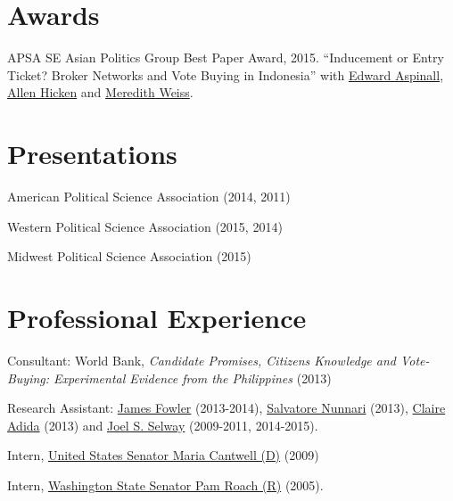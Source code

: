 \documentclass[letterpaper]{article}
\renewenvironment{itemize}{
  \begin{list}{}{
    \setlength{\leftmargin}{1.5em}
  }
}{
  \end{list}
}
\begin{document}
\section*{Awards}
\begin{itemize}
  \item APSA SE Asian Politics Group Best Paper Award, 2015. ``Inducement or Entry Ticket? Broker Networks and Vote Buying in Indonesia'' with \href{https://researchers.anu.edu.au/researchers/aspinall-et}{Edward Aspinall}, \href{http://www.allenhicken.com/}{Allen Hicken} and \href{http://www.albany.edu/rockefeller/faculty_pos_weiss.shtml}{Meredith Weiss}.
\end{itemize}


\section*{Presentations}
\begin{itemize}
  \item American Political Science Association (2014, 2011)
  \item Western Political Science Association (2015, 2014)
  \item Midwest Political Science Association (2015)
\end{itemize}

\section*{Professional Experience}

\begin{itemize}
\item Consultant: World Bank, \emph{Candidate Promises, Citizens Knowledge and Vote-Buying: Experimental Evidence from the Philippines} (2013)
\item Research Assistant:
  \href{http://jhfowler.ucsd.edu/}{James Fowler} (2013-2014),
  \href{http://polisci2.ucsd.edu/snunnari/}{Salvatore Nunnari} (2013),
  \href{http://polisci2.ucsd.edu/cadida/Site/Welcome.html}{Claire
    Adida} (2013)
  and 
  \href{http://fhssfaculty.byu.edu/FacultyPage.aspx?id=jss83}{Joel
    S. Selway} (2009-2011, 2014-2015).
\item Intern, \href{cantwell.senate.gov}{United States Senator Maria
    Cantwell (D)} (2009)

\item Intern, \href{http://www.leg.wa.gov/senate/senators/Pages/roach.aspx}{Washington
    State Senator Pam Roach (R)} (2005).
\end{itemize}
\end{document}

